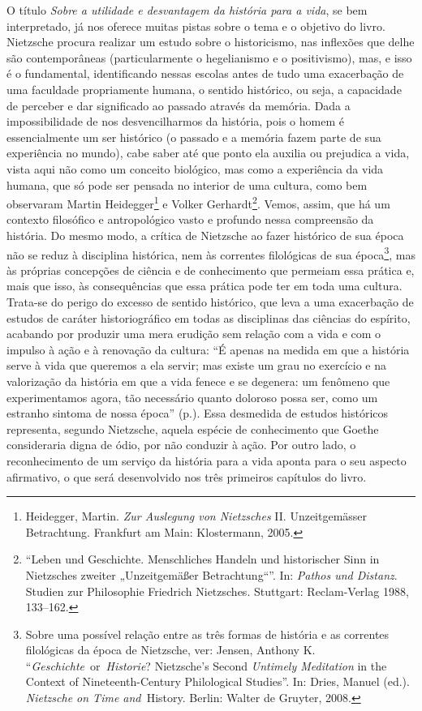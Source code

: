 O título \emph{Sobre a utilidade e desvantagem da história para a vida},
se bem interpretado, já nos oferece muitas pistas sobre o tema e o
objetivo do livro. Nietzsche procura realizar um estudo sobre o
historicismo, nas inflexões que delhe são contemporâneas (particularmente
o hegelianismo e o positivismo), mas, e isso é o fundamental,
identificando nessas escolas antes de tudo uma exacerbação de uma
faculdade propriamente humana, o sentido histórico, ou seja, a
capacidade de perceber e dar significado ao passado através da memória.
Dada a impossibilidade de nos desvencilharmos da história, pois o homem
é essencialmente um ser histórico (o passado e a memória fazem parte de
sua experiência no mundo), cabe saber até que ponto ela auxilia ou
prejudica a vida, vista aqui não como um conceito biológico, mas como a
experiência da vida humana, que só pode ser pensada no interior de uma
cultura, como bem observaram Martin Heidegger\footnote{
  Heidegger, Martin. \emph{Zur Auslegung von Nietzsches} II.
  Unzeitgemässer Betrachtung. Frankfurt am Main: Klostermann,
  2005.}
e Volker Gerhardt\footnote{``Leben und Geschichte. Menschliches Handeln
  und historischer Sinn in Nietzsches zweiter „Unzeitgemäßer
  Betrachtung``''. In: \emph{Pathos und Distanz}. Studien zur
  Philosophie Friedrich Nietzsches. Stuttgart: Reclam-Verlag 1988,
  133--162.}. Vemos, assim, que há um contexto filosófico e
antropológico vasto e profundo nessa compreensão da história. Do mesmo
modo, a crítica de Nietzsche ao fazer histórico de sua época não se
reduz à disciplina histórica, nem às correntes filológicas de sua
época\footnote{Sobre uma possível relação entre as três formas de
  história e as correntes filológicas da época de Nietzsche, ver:
  Jensen, Anthony K. ``\emph{Geschichte}~or~\emph{Historie}? Nietzsche's
  Second \emph{Untimely Meditation} in the Context of Nineteenth-Century
  Philological Studies''. In: Dries, Manuel (ed.). \emph{Nietzsche on
  Time and~}History. Berlin: Walter de Gruyter, 2008.}, mas às próprias
concepções de ciência e de conhecimento que permeiam essa prática e,
mais que isso, às consequências que essa prática pode ter em toda uma
cultura. Trata-se do perigo do excesso de sentido histórico, que leva a
uma exacerbação de estudos de caráter historiográfico em todas as
disciplinas das ciências do espírito, acabando por produzir uma mera
erudição sem relação com a vida e com o impulso à ação e à renovação da
cultura: ``É apenas na medida em que a história serve à vida que
queremos a ela servir; mas existe um grau no exercício e na valorização
da história em que a vida fenece e se degenera: um fenômeno que
experimentamos agora, tão necessário quanto doloroso possa ser, como um
estranho sintoma de nossa época'' (p.). Essa desmedida de estudos
históricos representa, segundo Nietzsche, aquela espécie de conhecimento
que Goethe consideraria digna de ódio, por não conduzir à ação. Por
outro lado, o reconhecimento de um serviço da história para a vida
aponta para o seu aspecto afirmativo, o que será desenvolvido nos três
primeiros capítulos do livro.

